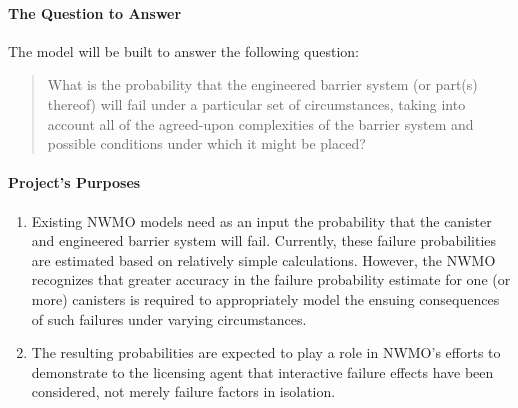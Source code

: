 \paragraph{The Question to Answer}
The model will be built to answer the following question: \begin{quote}What is the probability that the engineered barrier system (or part(s) thereof) will fail under a particular set of circumstances, taking into account all of the agreed-upon complexities of the barrier system and possible conditions under which it might be placed?\end{quote}
\paragraph{Project's Purposes}
\begin{enumerate}[noitemsep]
\item Existing NWMO models need as an input the probability that the canister and engineered barrier system will fail. Currently, these failure probabilities are estimated  based on relatively simple calculations. However, the NWMO recognizes that greater accuracy in the failure probability estimate for one (or more) canisters is required to appropriately model the ensuing consequences of such failures under varying circumstances.
\item The resulting probabilities are expected to play a role in NWMO's efforts to demonstrate to the licensing agent that interactive failure effects have been considered, not merely failure factors in isolation.
\end{enumerate}

